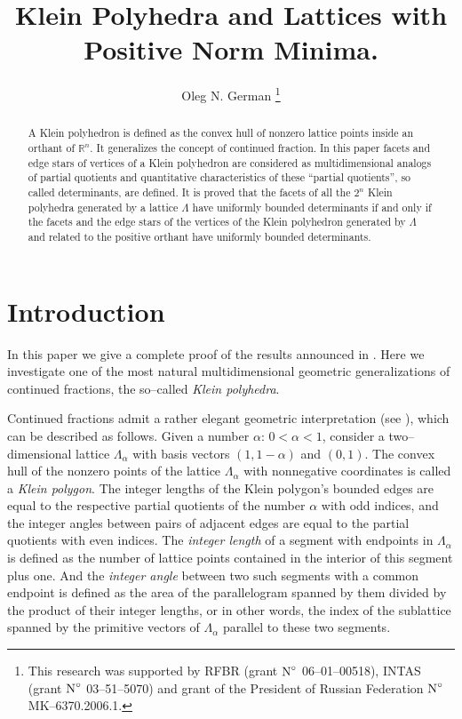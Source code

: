 \documentclass[11pt]{article}
\title{Klein Polyhedra and Lattices with Positive Norm Minima.}
\author{Oleg N. German \thanks{ This research was supported by
                                RFBR (grant $\textup N^\circ$ 06--01--00518),
                                INTAS (grant $\textup N^\circ$ 03--51--5070) and
                                grant of the President of Russian Federation
                                $\textup N^\circ$ MK--6370.2006.1.}}
\date{}
\theoremstyle{definition}
\theoremstyle{remark}
\theoremstyle{plain}
\newcommand{\La}{\Lambda}
\newcommand{\R}{\mathbb{R}}
\begin{document}
  \maketitle

  \begin{abstract}
    A Klein polyhedron is defined as the convex hull of nonzero lattice points inside an
    orthant of $\R^n$. It generalizes the concept of continued fraction. In this paper facets
    and edge stars of vertices of a Klein polyhedron are considered as multidimensional
    analogs of partial quotients and quantitative characteristics of these ``partial
    quotients'', so called determinants, are defined. It is proved that the facets of all the
    $2^n$ Klein polyhedra generated by a lattice $\La$ have uniformly bounded determinants if
    and only if the facets and the edge stars of the vertices of the Klein polyhedron
    generated by $\La$ and related to the positive orthant have uniformly bounded
    determinants.
  \end{abstract}



  \section{Introduction}




  In this paper we give a complete proof of the results announced in
  \cite{german_norm_minima_II}. Here we investigate one of the most natural multidimensional
  geometric generalizations of continued fractions, the so--called \emph{Klein polyhedra}.

  Continued fractions admit a rather elegant geometric interpretation
  (see \cite{erdos_gruber_hammer}), which can be described as follows. Given a number
  $\alpha$: $0<\alpha<1$, consider a two--dimensional lattice $\La_\alpha$ with basis vectors
  $(1,1-\alpha)$ and $(0,1)$. The convex hull of the nonzero points of the lattice $\La_\alpha$
  with nonnegative coordinates is called a \emph{Klein polygon}. The integer lengths of the
  Klein polygon's bounded edges are equal to the respective partial quotients of the
  number $\alpha$ with odd indices, and the integer angles between pairs of adjacent edges
  are equal to the partial quotients with even indices. The \emph{integer length} of a
  segment with endpoints in $\La_\alpha$ is defined as the number of lattice points contained
  in the interior of this segment plus one. And the \emph{integer angle} between two such
  segments with a common endpoint is defined as the area of the parallelogram spanned by them
  divided by the product of their integer lengths, or in other words, the index of the
  sublattice spanned by the primitive vectors of $\La_\alpha$ parallel to these two segments.
\end{document}
